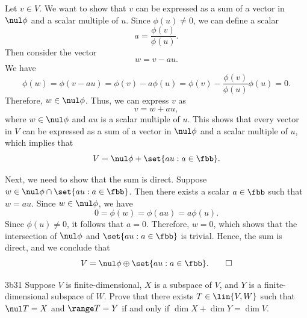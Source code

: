 \begin{sol}
    Let $v \in V$.
	We want to show that $v$ can be expressed as a sum of a vector in $\nul \phi$ and a scalar multiple of $u$.
	Since $\phi(u) \neq 0$, we can define a scalar
    \[
    	a = \frac{\phi(v)}{\phi(u)}.
    \]
    Then consider the vector
    \[
    	w = v - au.
    \]
    We have
    \[
    	\phi(w) = \phi(v - au) = \phi(v) - a\phi(u) = \phi(v) - \frac{\phi(v)}{\phi(u)}\phi(u) = 0.
    \]
    Therefore, $w \in \nul \phi$.
	Thus, we can express $v$ as
    \[
    	v = w + au,
    \]
    where $w \in \nul \phi$ and $au$ is a scalar multiple of $u$.
	This shows that every vector in $V$ can be expressed as a sum of a vector in $\nul \phi$ and a scalar multiple of $u$, which implies that
    \[
    	V = \nul \phi + \set{au : a \in \fbb}.
    \]

    Next, we need to show that the sum is direct.
	Suppose $w \in \nul \phi \cap \set{au : a \in \fbb}$.
	Then there exists a scalar $a \in \fbb$ such that $w = au$.
	Since $w \in \nul \phi$, we have
    \[
    	0 = \phi(w) = \phi(au) = a\phi(u).
    \]
    Since $\phi(u) \neq 0$, it follows that $a = 0$.
	Therefore, $w = 0$, which shows that the intersection of $\nul \phi$ and $\set{au : a \in \fbb}$ is trivial.
	Hence, the sum is direct, and we conclude that
    \[
    	V = \nul \phi \oplus \set{au : a \in \fbb}. \qedhere
    \]
\end{sol}

\begin{exercise}{3b31}
    Suppose $V$ is finite-dimensional, $X$ is a subspace of $V$, and $Y$ is a finite-dimensional subspace of $W$.
	Prove that there exists $T \in \lin{V, W}$ such that $\nul T = X$ and $\range T = Y$ if and only if $\dim X + \dim Y = \dim V$.
\end{exercise}

